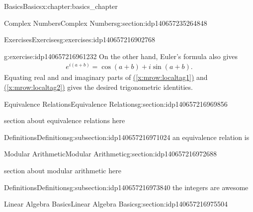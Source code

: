 \documentclass[oneside,10pt,]{book}
\numberwithin{equation}{section}
\begin{document}
\begin{chapterptx}{Basics}{}{Basics}{}{}{x:chapter:basics_chapter}
\begin{sectionptx}{Complex Numbers}{}{Complex Numbers}{}{}{g:section:idp140657235264848}
\begin{exercises-subsection}{Exercises}{}{Exercises}{}{}{g:exercises:idp140657216902768}
\begin{divisionexercise}{10}{}{}{g:exercise:idp140657216961232}
On the other hand, Euler's formula also gives%
\begin{gather}
e^{i(a+b)}= \cos(a+b) + i\sin
(a+b).\tag{\(\star\star\)}\label{x:mrow:localtag2}
\end{gather}
Equating real and and imaginary parts of \hyperref[x:mrow:localtag1]{(\ref{x:mrow:localtag1})} and \hyperref[x:mrow:localtag2]{(\ref{x:mrow:localtag2})} gives the desired trigonometric identities.\end{divisionexercise}%
\end{exercises-subsection}
\end{sectionptx}
%
%
\typeout{************************************************}
\typeout{************************************************}
%
\begin{sectionptx}{Equivalence Relations}{}{Equivalence Relations}{}{}{g:section:idp140657216969856}
\begin{introduction}{}%
section about equivalence relations here\end{introduction}%
%
%
\typeout{************************************************}
\typeout{************************************************}
%
\begin{subsectionptx}{Definitions}{}{Definitions}{}{}{g:subsection:idp140657216971024}
an equivalence relation is%
\end{subsectionptx}
\end{sectionptx}
%
%
\typeout{************************************************}
\typeout{************************************************}
%
\begin{sectionptx}{Modular Arithmetic}{}{Modular Arithmetic}{}{}{g:section:idp140657216972688}
\begin{introduction}{}%
section about modular arithmetic here\end{introduction}%
%
%
\typeout{************************************************}
\typeout{************************************************}
%
\begin{subsectionptx}{Definitions}{}{Definitions}{}{}{g:subsection:idp140657216973840}
the integers are awesome%
\end{subsectionptx}
\end{sectionptx}
%
%
\typeout{************************************************}
\typeout{************************************************}
%
\begin{sectionptx}{Linear Algebra Basics}{}{Linear Algebra Basics}{}{}{g:section:idp140657216975504}

\end{sectionptx}
\end{chapterptx}
\end{document}
